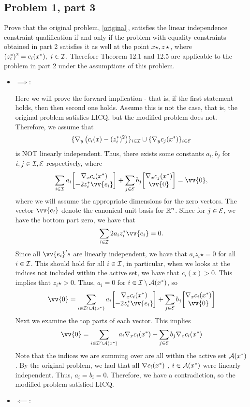 \subsection{Problem 1, part 3}
Prove that the original problem, \ref{original}, satisfies the linear independence constraint qualification if and only if the problem with equality constraints obtained in part 2 satisfies it as well at the point $x\star, z\star$, where $(z^*_i)^2 = c_i(x^*), \ i \in \mathcal{I}$. Therefore Theorem 12.1 and 12.5 are applicable to the problem in part 2 under the assumptions of this problem. 
\partbreak
\begin{solution}

    \begin{itemize}
        \item \underline{$\implies$}:
        
        \hop
        Here we will prove the forward implication - that is, if the first statement holds, then then second one holds. Assume this is not the case, that is, the original problem satisfies LICQ, but the modified problem does not. Therefore, we assume that 
        \[\{\nabla_y \left(c_i(x) - (z_i^*)^2\right)\}_{i \in \mathcal{I}}\cup \{\nabla_yc_j(x^*)\}_{i \in \mathcal{E}}\]
        is NOT linearly independent. Thus, there exists some constants $a_i, b_j$ for $i, j \in \mathcal{I}, \mathcal{E}$ respectively, where 
        \[\sum_{i \in \scI} a_i \mqty[\grad_x c_i(x\star)\\-2z_i\star \vv{e_i}] + \sum_{j \in \scE} b_j \mqty[\grad_xc_j(x\star)\\\vv{0}] = \vv{0},\]
        where we will assume the appropriate dimensions for the zero vectors. The vector $\vv{e_i}$ denote the canonical unit basis for $\mathbb{R}^n$. Since for $j \in \mathcal{E}$, we have the bottom part zero, we have that 
        \[\sum_{i \in \scI} 2a_iz_i\star \vv{e_i} = 0.\]
        Since all $\vv{e_i}'s$ are linearly independent, we have that $a_iz_i\star = 0$ for all $i \in \mathcal{I}$. This should hold for all $i \in \mathcal{I}$, in particular, when we looks at the indices not included within the active set, we have that $c_i(x) > 0$. This implies that $z_i\star > 0$. Thus, $a_i = 0$ for $i \in \mathcal{I} \setminus \mathcal{A}(x^*)$, so
        \[\vv{0} = \sum_{i \in \scI \cap \scA(x\star)} a_i \mqty[\grad_xc_i(x\star)\\-2z_i\star \vv{e_i}] + \sum_{j \in \scE} b_j \mqty[\grad_xc_i(x\star)\\\vv{0}]\]
        Next we examine the top parts of each vector. This implies
        \[\vv{0} = \sum_{i \in \scI \cap \scA(x\star)} a_i\grad_xc_i(x\star) + \sum_{j \in \scE} b_j \grad_x c_i(x\star)\]
        Note that the indices we are summing over are all within the active set $\mathcal{A}(x^*)$. By the original problem, we had that all $\nabla c_i(x^*)$ , $i \in \mathcal{A}(x^*)$ were linearly independent. Thus, $a_i = b_i = 0$. Therefore, we have a contradiction, so the modified problem satisfied LICQ.
        \newpage
        \item \underline{$\impliedby$}:


\end{itemize}
\end{solution}
